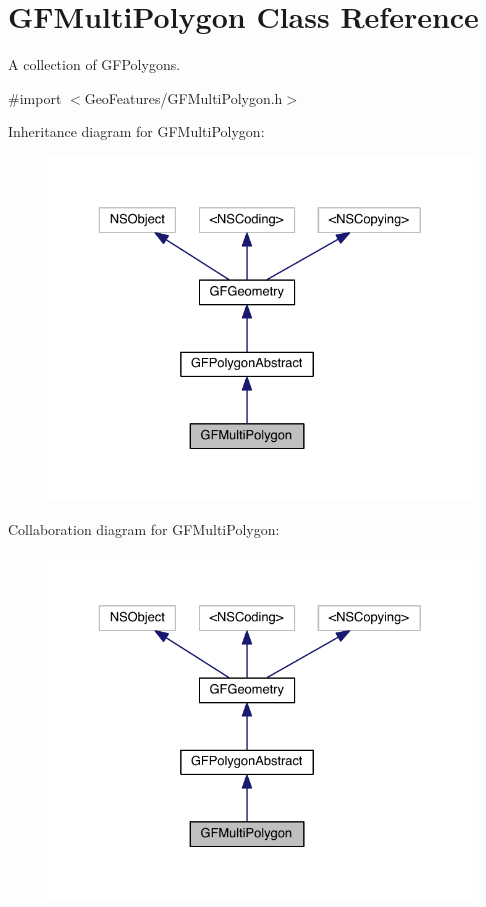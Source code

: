 \hypertarget{interface_g_f_multi_polygon}{}\section{G\+F\+Multi\+Polygon Class Reference}
\label{interface_g_f_multi_polygon}


A collection of G\+F\+Polygons.  




{\ttfamily \#import $<$Geo\+Features/\+G\+F\+Multi\+Polygon.\+h$>$}



Inheritance diagram for G\+F\+Multi\+Polygon\+:\nopagebreak
\begin{figure}[H]
\begin{center}
\leavevmode
\includegraphics[width=329pt]{interface_g_f_multi_polygon__inherit__graph}
\end{center}
\end{figure}


Collaboration diagram for G\+F\+Multi\+Polygon\+:\nopagebreak
\begin{figure}[H]
\begin{center}
\leavevmode
\includegraphics[width=329pt]{interface_g_f_multi_polygon__coll__graph}
\end{center}
\end{figure}
